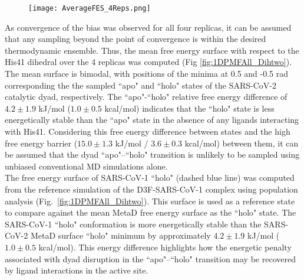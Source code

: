 \begin{figure}[!ht]
    \centering
    \texttt{[image: AverageFES\_4Reps.png]}
    \caption{}
    \label{fig:AverageFES}
\end{figure}

As convergence of the bias was observed for all four replicas, it can be assumed that any sampling beyond the point of convergence is within the desired thermodynamic ensemble. Thus, the mean free energy surface with respect to the His41 \dihtwo dihedral over the 4 replicas was computed (Fig \ref{fig:1DPMFAll_Dihtwo}). The mean surface is bimodal, with positions of the minima at 0.5 and -0.5 rad corresponding the the sampled ``apo" and ``holo" states of the SARS-CoV-2  catalytic dyad, respectively. The ``apo"-``holo" relative free energy difference of $4.2 \pm 1.9$ kJ/mol ($1.0 \pm 0.5$ kcal/mol) indicates that the ``holo" state is less energetically stable than the ``apo" state in the absence of any ligands interacting with His41. Considering this free energy difference between states and the high free energy barrier ($15.0 \pm 1.3$ kJ/mol / $3.6 \pm 0.3$ kcal/mol) between them, it can be assumed that the dyad ``apo"--``holo" transition is unlikely to be sampled using unbiased conventional MD simulations alone.\\

The free energy surface of SARS-CoV-1 ``holo" (dashed blue line) was computed from the reference simulation of the D3F-SARS-CoV-1  complex using population analysis (Fig.~\ref{fig:1DPMFAll_Dihtwo}). This surface is used as a reference state to compare against the mean MetaD free energy surface as the ``holo" state. The SARS-CoV-1 ``holo" conformation is more energetically stable than the SARS-CoV-2 MetaD surface ``holo" minimum by approximately $4.2 \pm 1.9$ kJ/mol ($1.0 \pm 0.5$ kcal/mol). This energy difference highlights how the energetic penalty associated with dyad disruption in the ``apo"--``holo" transition may be recovered by ligand interactions in the active site. \\

